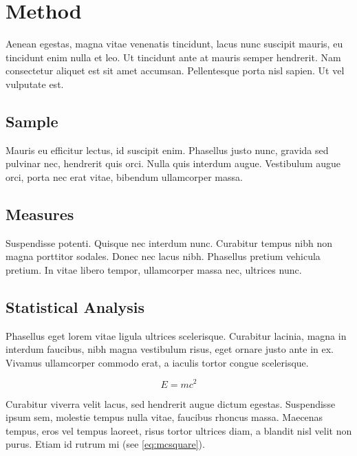 \section{Method}\label{sec:Method}

Aenean egestas, magna vitae venenatis tincidunt, lacus nunc suscipit mauris, eu tincidunt enim nulla et leo. Ut tincidunt ante at mauris semper hendrerit. Nam consectetur aliquet est sit amet accumsan. Pellentesque porta nisl sapien. Ut vel vulputate est.

\subsection{Sample}

Mauris eu efficitur lectus, id suscipit enim. Phasellus justo nunc, gravida sed pulvinar nec, hendrerit quis orci. Nulla quis interdum augue. Vestibulum augue orci, porta nec erat vitae, bibendum ullamcorper massa.

\subsection{Measures}

Suspendisse potenti. Quisque nec interdum nunc. Curabitur tempus nibh non magna porttitor sodales. Donec nec lacus nibh. Phasellus pretium vehicula pretium. In vitae libero tempor, ullamcorper massa nec, ultrices nunc.

\subsection{Statistical Analysis}

Phasellus eget lorem vitae ligula ultrices scelerisque. Curabitur lacinia, magna in interdum faucibus, nibh magna vestibulum risus, eget ornare justo ante in ex. Vivamus ullamcorper commodo erat, a iaculis tortor congue scelerisque.

\begin{equation}\label{eq:mcsquare}
    E=mc^2
\end{equation}

Curabitur viverra velit lacus, sed hendrerit augue dictum egestas. Suspendisse ipsum sem, molestie tempus nulla vitae, faucibus rhoncus massa. Maecenas tempus, eros vel tempus laoreet, risus tortor ultrices diam, a blandit nisl velit non purus. Etiam id rutrum mi (see \cref{eq:mcsquare}).
